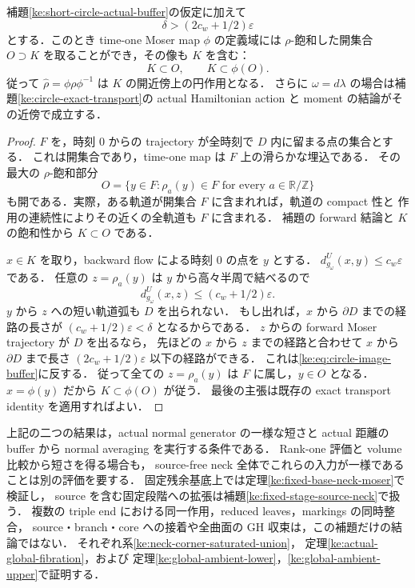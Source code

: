 \begin{corollary}
\label{ke:short-circle-image-buffer}
補題\ref{ke:short-circle-actual-buffer}の仮定に加えて
\begin{equation}\label{ke:eq:circle-image-buffer}
 \delta>(2c_w+1/2)\varepsilon
\end{equation}
とする．このとき time-one Moser map $\phi$ の定義域には
$\rho$-飽和した開集合 $O\supset K$ を取ることができ，その像も $K$ を含む：
\[
 K\subset O,\qquad K\subset\phi(O).
\]
従って $\widehat\rho=\phi\rho\phi^{-1}$ は $K$ の開近傍上の円作用となる．
さらに $\omega=d\lambda$ の場合は補題\ref{ke:circle-exact-transport}の
actual Hamiltonian action と moment の結論がその近傍で成立する．
\end{corollary}
\begin{proof}
$F$ を，時刻 $0$ からの trajectory が全時刻で $D$ 内に留まる点の集合とする．
これは開集合であり，time-one map は $F$ 上の滑らかな埋込である．
その最大の $\rho$-飽和部分
\[
 O=\{y\in F:\rho_a(y)\in F\text{ for every }a\in\mathbb R/\mathbb Z\}
\]
も開である．実際，ある軌道が開集合 $F$ に含まれれば，軌道の compact 性と
作用の連続性によりその近くの全軌道も $F$ に含まれる．
補題の forward 結論と $K$ の飽和性から $K\subset O$ である．

$x\in K$ を取り，backward flow による時刻 $0$ の点を $y$ とする．
$d_{g_\omega}^{U}(x,y)\le c_w\varepsilon$ である．
任意の $z=\rho_a(y)$ は $y$ から高々半周で結べるので
\[
 d_{g_\omega}^{U}(x,z)\le(c_w+1/2)\varepsilon.
\]
$y$ から $z$ への短い軌道弧も $D$ を出られない．
もし出れば，$x$ から $\partial D$ までの経路の長さが
$(c_w+1/2)\varepsilon<\delta$ となるからである．
$z$ からの forward Moser trajectory が $D$ を出るなら，
先ほどの $x$ から $z$ までの経路と合わせて
$x$ から $\partial D$ まで長さ $(2c_w+1/2)\varepsilon$ 以下の経路ができる．
これは\eqref{ke:eq:circle-image-buffer}に反する．
従って全ての $z=\rho_a(y)$ は $F$ に属し，$y\in O$ となる．
$x=\phi(y)$ だから $K\subset\phi(O)$ が従う．
最後の主張は既存の exact transport identity を適用すればよい．
\end{proof}

\begin{remark}
上記の二つの結果は，actual normal generator の一様な短さと
actual 距離の buffer から normal averaging を実行する条件である．
Rank-one 評価と volume 比較から短さを得る場合も，
source-free neck 全体でこれらの入力が一様であることは別の評価を要する．
固定残余基底上では定理\ref{ke:fixed-base-neck-moser}で検証し，
source を含む固定段階への拡張は補題\ref{ke:fixed-stage-source-neck}で扱う．
複数の triple end における同一作用，reduced leaves，markings の同時整合，
source・branch・core への接着や全曲面の GH 収束は，この補題だけの結論ではない．
それぞれ系\ref{ke:neck-corner-saturated-union}，
定理\ref{ke:actual-global-fibration}，および
定理\ref{ke:global-ambient-lower}，\ref{ke:global-ambient-upper}で証明する．
\end{remark}

